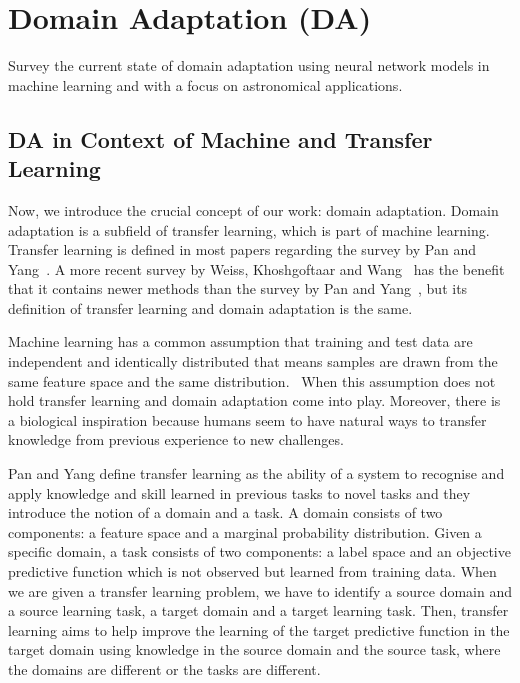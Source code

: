 \chapter{Domain Adaptation (DA)}
\label{da_chapter}

Survey the current state of domain adaptation using neural network models in machine learning and with a focus on astronomical applications.

\section{DA in Context of Machine and Transfer Learning}

Now, we introduce the crucial concept of our work: domain adaptation.
Domain adaptation is a subfield of transfer learning,
which is part of machine learning.
Transfer learning is defined in most papers regarding the survey by Pan and Yang~\cite{pan2010}.
A more recent survey by Weiss, Khoshgoftaar and Wang~\cite{weiss2016} has the benefit
that it contains newer methods than the survey by Pan and Yang~\cite{pan2010},
but its definition of transfer learning and domain adaptation is the same.

Machine learning has a common assumption that training and test data are independent and identically distributed
that means samples are drawn from the same feature space and the same distribution.~\cite{daume2006}
When this assumption does not hold transfer learning and domain adaptation come into play.
Moreover, there is a biological inspiration
because humans seem to have natural ways to transfer knowledge from previous experience to new challenges.~\cite{torrey2010}

Pan and Yang define transfer learning as the ability of a system to recognise and apply knowledge and skill learned in previous tasks to novel tasks
and they introduce the notion of a domain and a task.
A domain consists of two components: a feature space and a marginal probability distribution.
Given a specific domain, a task consists of two components: a label space and an objective predictive function
which is not observed but learned from training data.
When we are given a transfer learning problem,
we have to identify a source domain and a source learning task,
a target domain and a target learning task.
Then, transfer learning aims to help improve the learning of the target predictive function in the target domain using knowledge in the source domain and the source task,
where the domains are different or the tasks are different.~\cite{pan2010}

